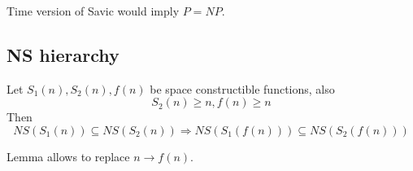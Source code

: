 \begin{note}
	Time version of Savic would imply $P = NP$.
\end{note}

\subsection{NS hierarchy}

\begin{lemma}\label{transl_space}
	Let $S_1(n), S_2(n), f(n)$ be space constructible functions, also
	\[ S_2(n) \geq n, f(n) \geq n \]
	Then
	\[ NS(S_1(n)) \subseteq NS(S_2(n)) \Rightarrow NS(S_1(f(n))) \subseteq NS(S_2(f(n))) \]

	Lemma allows to replace $n \to f(n)$.
\end{lemma}
